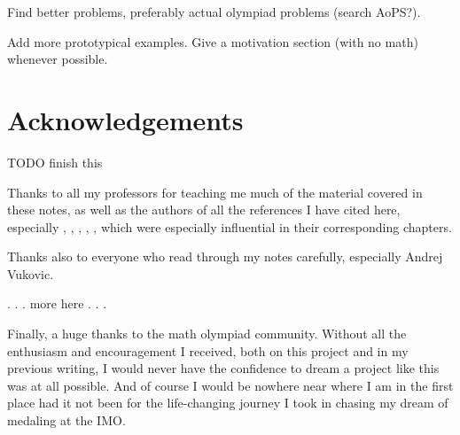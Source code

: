 Find better problems, preferably actual olympiad problems (search AoPS?).

Add more prototypical examples.
Give a motivation section (with no math) whenever possible.

\section*{Acknowledgements}
TODO finish this

Thanks to all my professors for teaching me much of the
material covered in these notes,
as well as the authors of all the references I have cited here,
especially
\cite{ref:55a},
\cite{ref:msci},
\cite{ref:dartmouth},
\cite{ref:oggier_NT},
\cite{ref:manifolds},
which were especially influential in their corresponding chapters.


Thanks also to everyone who read through my notes carefully, especially Andrej Vukovic.

. . . more here . . .

Finally, a huge thanks to the math olympiad community.
Without all the enthusiasm and encouragement I received,
both on this project and in my previous writing,
I would never have the confidence to dream a project like this
was at all possible.
And of course I would be nowhere near where I am in the first place
had it not been for the life-changing journey I took
in chasing my dream of medaling at the IMO.
